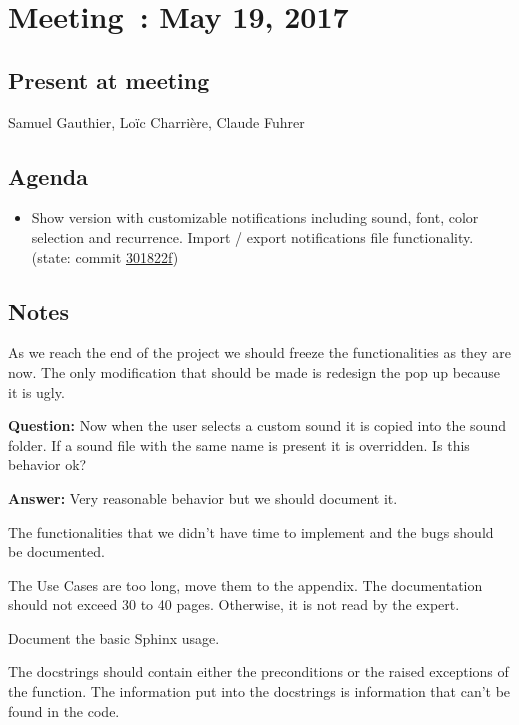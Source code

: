 \section{Meeting~: May 19, 2017}

\subsection*{Present at meeting}
Samuel Gauthier, Loïc Charrière, Claude Fuhrer

\subsection*{Agenda}
\begin{itemize}
    \item Show version with customizable notifications including sound, font,
        color selection and recurrence. Import / export notifications file
        functionality.
        (state: commit \href{https://github.com/BFH-BTI7301-project1/%
        ClockAlarm/tree/301822f044941c5058649d715016e683bc59eee8}{301822f})
\end{itemize}

\subsection*{Notes}

As we reach the end of the project we should freeze the functionalities as they
are now. The only modification that should be made is redesign the pop up
because it is ugly.

\textbf{Question:} Now when the user selects a custom sound it is copied into
the sound folder. If a sound file with the same name is present it is
overridden. Is this behavior ok?

\textbf{Answer:} Very reasonable behavior but we should document it.

The functionalities that we didn't have time to implement and the bugs should be
documented.

The Use Cases are too long, move them to the appendix. The documentation should
not exceed 30 to 40 pages. Otherwise, it is not read by the expert.

Document the basic Sphinx usage.

The docstrings should contain either the preconditions or the raised exceptions
of the function. The information put into the docstrings is information that
can't be found in the code.

